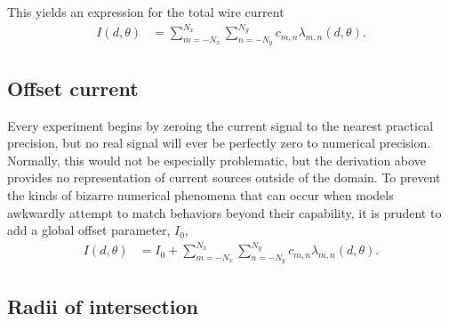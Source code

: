 \documentclass{article}
\begin{document}
This yields an expression for the total wire current
\begin{align}
I(d,\theta) &= \sum_{m=-N_x}^{N_x} \sum_{n=-N_y}^{N_y} c_{m,n} \lambda_{m,n}(d,\theta).
\end{align}

\subsection{Offset current}

Every experiment begins by zeroing the current signal to the nearest practical precision, but no real signal will ever be perfectly zero to numerical precision.  Normally, this would not be especially problematic, but the derivation above provides no representation of current sources outside of the domain.  To prevent the kinds of bizarre numerical phenomena that can occur when models awkwardly attempt to match behaviors beyond their capability, it is prudent to add a global offset parameter, $I_0$,  
\begin{align}
I(d,\theta) &= I_0 + \sum_{m=-N_x}^{N_x} \sum_{n=-N_y}^{N_y} c_{m,n} \lambda_{m,n}(d,\theta)\label{eqn:I}.
\end{align}

\subsection{Radii of intersection}
\end{document}
